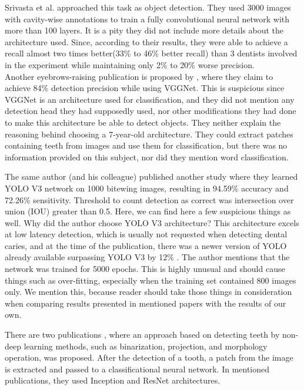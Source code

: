 Srivasta et al. \cite{Srivastava2017} approached this task as object detection. They used 3000 images with cavity-wise annotations to train a fully convolutional neural network with more than 100 layers. It is a pity they did not include more details about the architecture used. Since, according to their results, they were able to achieve a recall almost two times better(33\% to 46\% better recall) than 3 dentists involved in the experiment while maintaining only 2\% to 20\% worse precision. \\

Another eyebrows-raising publication is proposed by \cite{Bayrakdar2021}, where they claim to achieve 84\% detection precision while using VGGNet. This is suspicious since VGGNet is an architecture used for classification, and they did not mention any detection head they had supposedly used, nor other modifications they had done to make this architecture be able to detect objects. They neither explain the reasoning behind choosing a 7-year-old architecture. They could extract patches containing teeth from images and use them for classification, but there was no information provided on this subject, nor did they mention word classification.

The same author (and his colleague) published another study \cite{Bayraktar2021} where they learned YOLO V3 network on 1000 bitewing images, resulting in 94.59\% accuracy and 72.26\% sensitivity. Threshold to count detection as correct was intersection over union (IOU) greater than 0.5. Here, we can find here a few suspicious things as well. Why did the author choose YOLO V3  \cite{Redmon2018} architecture? This architecture excels at low latency detection, which is usually not requested when detecting dental caries, and at the time of the publication, there was a newer version of YOLO already available surpassing YOLO V3 by 12\% \cite{Bochkovskiy2020}. The author mentions that the network was trained for 5000 epochs. This is highly unusual and should cause things such as over-fitting, especially when the training set contained 800 images only. We mention this, because reader should take those things in consideration when comparing results presented in mentioned papers with the results of our own.

There are two publications \cite{Mao2021, Moran2021}, where an approach based on detecting teeth by non-deep learning methods, such as binarization, projection, and morphology operation, was proposed. After the detection of a tooth, a patch from the image is extracted and passed to a classificational neural network. In mentioned publications, they used Inception and ResNet architectures.